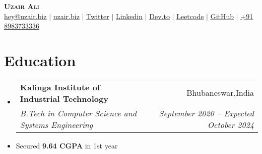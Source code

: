 \documentclass[letterpaper,11pt]{article}
\makeatletter
\newcommand{\resumeItem}[1]{
  \item\small{
    {#1 \vspace{-2pt}}
  }
}
\newcommand{\resumeSubheading}[4]{
  \vspace{-2pt}\item
    \begin{tabular*}{0.97\textwidth}[t]{l@{\extracolsep{\fill}}r}
      \textbf{#1} & #2 \\
      \textit{\small#3} & \textit{\small #4} \\
    \end{tabular*}\vspace{-7pt}
}
\newcommand{\resumeSubHeadingListStart}{\begin{itemize}[leftmargin=0.15in, label={}]}
\newcommand{\resumeSubHeadingListEnd}{\end{itemize}}
\makeatother
\begin{document}

\begin{center}
    \textbf{\Huge \scshape Uzair Ali} \\ \vspace{1pt}
    \href{mailto:hey@uzair.biz}{\underline{hey@uzair.biz}} $|$ 
    \href{https://uzair.biz/}{\underline{uzair.biz}} $|$ 
    \href{https://twitter.com/UzairAli101}{\underline{Twitter}} $|$ 
    \href{https://linkedin.com/in/uzair-ali10}{\underline{Linkedin}} $|$
    \href{https://dev.to/uzairali10/}{\underline{Dev.to}} $|$
    \href{https://leetcode.com/uzair-ali10/}{\underline{Leetcode}} $|$
    \href{https://github.com/uzair-ali10}{\underline{GitHub}} $|$
    \href{}{\underline{+91 8983733336}}
    
\end{center}

\section{Education}
  \resumeSubHeadingListStart
    \resumeSubheading
      {Kalinga Institute of Industrial Technology}{Bhubaneswar,India}
      {B.Tech in Computer Science and Systems Engineering}{September 2020 -- Expected October 2024}
      \resumeItem{Secured \textbf{9.64 CGPA} in 1st year}
  \resumeSubHeadingListEnd


\end{document}
